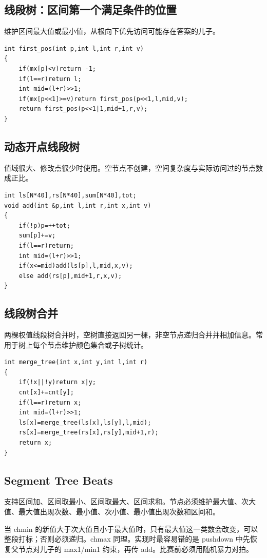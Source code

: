 \subsection{线段树：区间第一个满足条件的位置}

维护区间最大值或最小值，从根向下优先访问可能存在答案的儿子。

\begin{verbatim}
int first_pos(int p,int l,int r,int v)
{
    if(mx[p]<v)return -1;
    if(l==r)return l;
    int mid=(l+r)>>1;
    if(mx[p<<1]>=v)return first_pos(p<<1,l,mid,v);
    return first_pos(p<<1|1,mid+1,r,v);
}
\end{verbatim}
\subsection{动态开点线段树}

值域很大、修改点很少时使用。空节点不创建，空间复杂度与实际访问过的节点数成正比。

\begin{verbatim}
int ls[N*40],rs[N*40],sum[N*40],tot;
void add(int &p,int l,int r,int x,int v)
{
    if(!p)p=++tot;
    sum[p]+=v;
    if(l==r)return;
    int mid=(l+r)>>1;
    if(x<=mid)add(ls[p],l,mid,x,v);
    else add(rs[p],mid+1,r,x,v);
}
\end{verbatim}
\subsection{线段树合并}

两棵权值线段树合并时，空树直接返回另一棵，非空节点递归合并并相加信息。常用于树上每个节点维护颜色集合或子树统计。

\begin{verbatim}
int merge_tree(int x,int y,int l,int r)
{
    if(!x||!y)return x|y;
    cnt[x]+=cnt[y];
    if(l==r)return x;
    int mid=(l+r)>>1;
    ls[x]=merge_tree(ls[x],ls[y],l,mid);
    rs[x]=merge_tree(rs[x],rs[y],mid+1,r);
    return x;
}
\end{verbatim}
\subsection{Segment Tree Beats}

支持区间加、区间取最小、区间取最大、区间求和。节点必须维护最大值、次大值、最大值出现次数、最小值、次小值、最小值出现次数和区间和。

当 chmin 的新值大于次大值且小于最大值时，只有最大值这一类数会改变，可以整段打标；否则必须递归。chmax 同理。实现时最容易错的是 pushdown 中先恢复父节点对儿子的 max1/min1 约束，再传 add。比赛前必须用随机暴力对拍。


